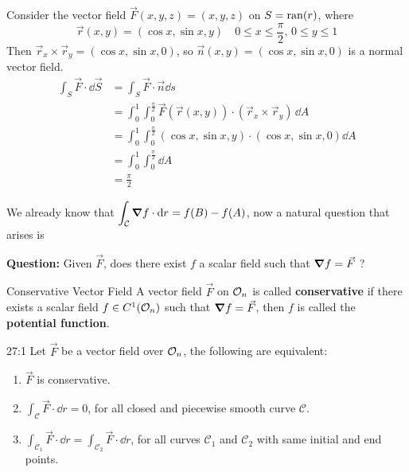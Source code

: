 \documentclass[../Analysis-3.tex]{subfiles}
\begin{document}
\begin{Eg}{}{}
  Consider the vector field $\vec{F}(x,y,z) = (x,y,z)$ on $S = \operatorname{ran}(r)$, where
  \[
    \vec{r}(x,y) = (\cos x, \sin x, y) \quad 0 \leq x \leq \frac{\pi}{2}, \, 0 \leq y \leq 1
  \]
  Then $\vec{r}_x \times \vec{r}_y = (\cos x, \sin x, 0)$, so $\vec{n}(x,y) = (\cos x, \sin x, 0)$ is a normal vector field.
  \begin{align*}
    \int_S \vec{F} \cdot \dd \vec{S}
     & = \int_S \vec{F} \cdot \vec{n} \dd s                                                                \\
     & = \int_0^1 \int_0^{\frac{\pi}{2}} \vec{F}(\vec{r}(x,y)) \cdot (\vec{r}_x \times \vec{r}_y) \, \dd A \\
     & = \int_0^1 \int_0^{\frac{\pi}{2}}  (\cos x, \sin x, y) \cdot (\cos x, \sin x, 0) \dd A              \\
     & = \int_0^1 \int_{0}^{\frac{\pi}{2}} \dd A                                                           \\
     & = \frac{\pi}{2}
  \end{align*}
\end{Eg}

We already know that $\displaystyle\int_{\mathcal{C}} \grad f \cdot \dd r = f(B) - f(A)$, now a natural question that arises is

\textbf{Question:} Given $\vec{F}$, does there exist $f$ a scalar field such that $\grad f = \vec{F}$ ?

\begin{Def}{Conservative Vector Field}{}
  A vector field $\vec{F}$ on $\mathcal{O}_{n}$ is called \textbf{conservative} if there exists a scalar field $f \in C^1(\mathcal{O}_{n})$ such that $\grad f = \vec{F}$, then $f$ is called the \textbf{potential function}.
\end{Def}

\begin{Thm}{}{27:1}
  Let $\vec{F}$ be a vector field over $\mathcal{O}_{n}$, the following are equivalent:
  \begin{enumerate}
    \item $\vec{F}$ is conservative.
    \item $\displaystyle\int_{\mathcal{C}}\vec{F} \cdot \dd r = 0$, for all closed and piecewise smooth curve $\mathcal{C}$.
    \item $\displaystyle\int_{\mathcal{C}_1} \vec{F} \cdot \dd r = \int_{\mathcal{C}_2} \vec{F} \cdot \dd r$, for all curves $\mathcal{C}_1$ and $\mathcal{C}_2$ with same initial and end points.
  \end{enumerate}
\end{Thm}
\end{document}
